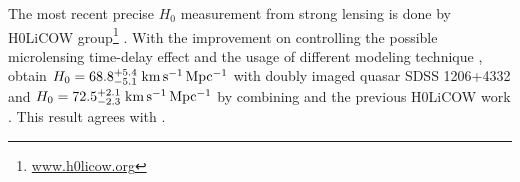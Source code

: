 \documentclass[useAMS,usenatbib]{mnras}
\newcommand\rxj{RXJ\,1131$-$1231}
\newcommand\he{HE\,0435$-$1223}
\newcommand\bb{B\,1608$+$656}
\def\kmsmpc{\rm km\,s^{-1}\,Mpc^{-1}}
\begin{document}
The most recent precise $H_{0}$ measurement from strong lensing is done by H0LiCOW group\footnote{\url{www.h0licow.org}} %
\citep[H0 Lenses in COSMOGRAIL’s Wellspring,][]{suyuEtal17}. With the improvement on controlling the possible microlensing time-delay effect \citep{TieKochanek18,GChenEtal18a} and the usage of different modeling technique \citep{BirrerEtal15,BirrerAmara18}, \citet{BirrerEtal18} obtain $H_{0}=68.8\substack{+5.4\\-5.1}~\kmsmpc$ with doubly imaged quasar SDSS 1206+4332 and $H_{0}=72.5\substack{+2.1\\-2.3}~\kmsmpc$ by combining \citet{FassnachtEtal02} and the previous H0LiCOW work \citep{SuyuEtal09,SuyuEtal10,SuyuEtal13,SuyuEtal14,SluseEtal17,RusuEtal17,WongEtal17,BonvinEtal17}. This result agrees with \citet{RiessEtal18c}.


\end{document}
